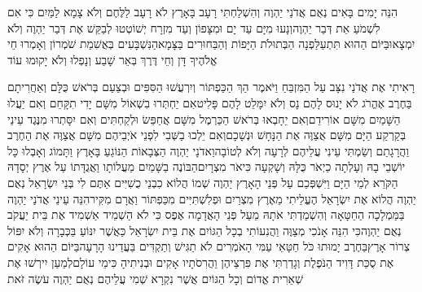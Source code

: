 \documentclass[../main/main.tex]{subfiles}
\begin{document}
\begin{multicols}{\ncols}
הִנֵּה יָמִים בָּאִים נְאֻם אֲדֹנַי יַהְוֶה וְהִשְׁלַחְתִּי רָעָב בָּאָרֶץ לֹא רָעָב לַלֶּחֶם וְלֹא צָמָא לַמַּיִם כִּי אִם לִשְׁמֹעַ אֵת דְּבַר\SubEnd{} יַהְוֶה\PreVerseSpace{}וְנָעוּ מִיָּם עַד יָם וּמִצָּפוֹן וְעַד מִזְרָח יְשׁוֹטְטוּ לְבַקֵּשׁ אֶת דְּבַר יַהְוֶה וְלֹא יִמְצָאוּ\PreVerseSpace{}בַּיּוֹם הַהוּא תִּתְעַלַּפְנָה הַבְּתוּלֹת הַיָּפוֹת וְהַבַּחוּרִים בַּצָּמָא\PreVerseSpace{}הַנִּשְׁבָּעִים בְּאֲשִׁמַת\SubEnd{} שֹׁמְרוֹן וְאָמְרוּ חֵי אֱלֹהֶיךָ דָּן וְחֵי דֶּרֶךְ בְּאֵר שָׁבַע וְנָפְלוּ וְלֹא יָקוּמוּ עוֹד\OpenSection{}\par
{}רָאִיתִי אֶת אֲדֹנַי נִצָּב עַל הַמִּזְבֵּחַ וַיֹּאמֶר הַךְ הַכַּפְתּוֹר וְיִרְעֲשׁוּ הַסִּפִּים וּבְצַעַם בְּרֹאשׁ כֻּלָּם וְאַחֲרִיתָם בַּחֶרֶב אֶהֱרֹג לֹא יָנוּס לָהֶם נָס וְלֹא יִמָּלֵט לָהֶם פָּלִיט\PreVerseSpace{}אִם יַחְתְּרוּ בִשְׁאוֹל מִשָּׁם יָדִי תִקָּחֵם וְאִם יַעֲלוּ הַשָּׁמַיִם מִשָּׁם אוֹרִידֵם\PreVerseSpace{}וְאִם יֵחָבְאוּ בְּרֹאשׁ הַכַּרְמֶל מִשָּׁם אֲחַפֵּשׂ וּלְקַחְתִּים וְאִם יִסָּתְרוּ מִנֶּגֶד עֵינַי בְּקַרְקַע הַיָּם מִשָּׁם אֲצַוֶּה אֶת הַנָּחָשׁ וּנְשָׁכָם\PreVerseSpace{}וְאִם יֵלְכוּ בַשְּׁבִי לִפְנֵי אֹיְבֵיהֶם מִשָּׁם אֲצַוֶּה אֶת הַחֶרֶב וַהֲרָגָתַם וְשַׂמְתִּי עֵינִי עֲלֵיהֶם לְרָעָה וְלֹא לְטוֹבָה\PreVerseSpace{}וַאדֹנָי יַהְוֶה הַצְּבָאוֹת הַנּוֹגֵעַ בָּאָרֶץ וַתָּמוֹג וְאָבְלוּ כָּל יוֹשְׁבֵי בָהּ וְעָלְתָה כַיְאֹר כֻּלָּהּ וְשָׁקְעָה כִּיאֹר מִצְרָיִם\PreVerseSpace{}הַבּוֹנֶה בַשָּׁמַיִם מַעֲלוֹתָו וַאֲגֻדָּתוֹ עַל אֶרֶץ יְסָדָהּ הַקֹּרֵא לְמֵי הַיָּם וַיִּשְׁפְּכֵם עַל פְּנֵי הָאָרֶץ יַהְוֶה שְׁמוֹ \ClosedSection{}הֲלוֹא כִבְנֵי כֻשִׁיִּים אַתֶּם לִי בְּנֵי יִשְׂרָאֵל נְאֻם יַהְוֶה הֲלוֹא אֶת יִשְׂרָאֵל הֶעֱלֵיתִי מֵאֶרֶץ מִצְרַיִם וּפְלִשְׁתִּיִּים מִכַּפְתּוֹר וַאֲרָם מִקִּיר\PreVerseSpace{}הִנֵּה עֵינֵי אֲדֹנַי יַהְוֶה בַּמַּמְלָכָה הַחַטָּאָה וְהִשְׁמַדְתִּי אֹתָהּ מֵעַל פְּנֵי הָאֲדָמָה אֶפֶס כִּי לֹא הַשְׁמֵיד אַשְׁמִיד אֶת בֵּית יַעֲקֹב נְאֻם יַהְוֶה\PreVerseSpace{}כִּי הִנֵּה אָנֹכִי מְצַוֶּה וַהֲנִעוֹתִי בְכָל הַגּוֹיִם אֶת בֵּית יִשְׂרָאֵל כַּאֲשֶׁר יִנּוֹעַ בַּכְּבָרָה וְלֹא יִפּוֹל צְרוֹר אָרֶץ\PreVerseSpace{}בַּחֶרֶב יָמוּתוּ כֹּל חַטָּאֵי עַמִּי הָאֹמְרִים לֹא תַגִּישׁ וְתַקְדִּים בַּעֲדֵינוּ הָרָעָה\PreVerseSpace{}בַּיּוֹם הַהוּא אָקִים אֶת סֻכַּת דָּוִיד הַנֹּפֶלֶת וְגָדַרְתִּי אֶת פִּרְצֵיהֶן וַהֲרִסֹתָיו אָקִים וּבְנִיתִיהָ כִּימֵי עוֹלָם\PreVerseSpace{}לְמַעַן יִירְשׁוּ אֶת שְׁאֵרִית אֱדוֹם וְכָל הַגּוֹיִם אֲשֶׁר נִקְרָא שְׁמִי עֲלֵיהֶם נְאֻם יַהְוֶה עֹשֶׂה זֹּאת\OpenSection{}\par

\end{multicols}
\end{document}
